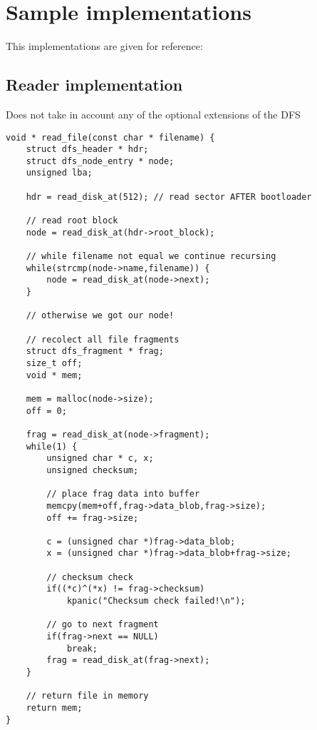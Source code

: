 \documentclass[12pt]{article}
\begin{document}
\newpage

\section{Sample implementations}
This implementations are given for reference:

\subsection{Reader implementation}
Does not take in account any of the optional extensions of the DFS
\begin{verbatim}
void * read_file(const char * filename) {
	struct dfs_header * hdr;
	struct dfs_node_entry * node;
	unsigned lba;
	
	hdr = read_disk_at(512); // read sector AFTER bootloader
	
	// read root block
	node = read_disk_at(hdr->root_block);
	
	// while filename not equal we continue recursing
	while(strcmp(node->name,filename)) {
		node = read_disk_at(node->next);
	}
	
	// otherwise we got our node!
	
	// recolect all file fragments
	struct dfs_fragment * frag;
	size_t off;
	void * mem;
	
	mem = malloc(node->size);
	off = 0;
	
	frag = read_disk_at(node->fragment);
	while(1) {
		unsigned char * c, x;
		unsigned checksum;
		
		// place frag data into buffer
		memcpy(mem+off,frag->data_blob,frag->size);
		off += frag->size;
		
		c = (unsigned char *)frag->data_blob;
		x = (unsigned char *)frag->data_blob+frag->size;
		
		// checksum check
		if((*c)^(*x) != frag->checksum)
			kpanic("Checksum check failed!\n");
		
		// go to next fragment
		if(frag->next == NULL)
			break;
		frag = read_disk_at(frag->next);
	}
	
	// return file in memory
	return mem;
}
\end{verbatim}
\end{document}
